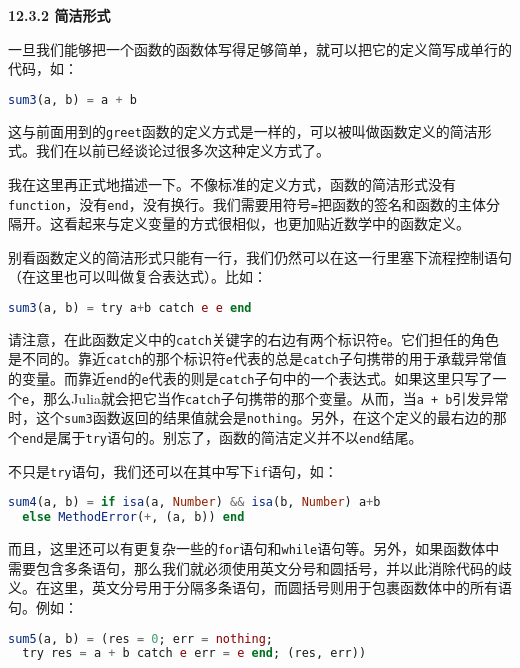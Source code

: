 \textbf{12.3.2 简洁形式}

一旦我们能够把一个函数的函数体写得足够简单，就可以把它的定义简写成单行的代码，如：

\begin{lstlisting}[language=julia]
sum3(a, b) = a + b
\end{lstlisting}

这与前面用到的\verb|greet|函数的定义方式是一样的，可以被叫做函数定义的简洁形式。我们在以前已经谈论过很多次这种定义方式了。
 
我在这里再正式地描述一下。不像标准的定义方式，函数的简洁形式没有\verb|function|，没有\verb|end|，没有换行。我们需要用符号\verb|=|把函数的签名和函数的主体分隔开。这看起来与定义变量的方式很相似，也更加贴近数学中的函数定义。

别看函数定义的简洁形式只能有一行，我们仍然可以在这一行里塞下流程控制语句（在这里也可以叫做复合表达式）。比如：

\begin{lstlisting}[language=julia]
sum3(a, b) = try a+b catch e e end
\end{lstlisting}

请注意，在此函数定义中的\verb|catch|关键字的右边有两个标识符\verb|e|。它们担任的角色是不同的。靠近\verb|catch|的那个标识符\verb|e|代表的总是\verb|catch|子句携带的用于承载异常值的变量。而靠近\verb|end|的\verb|e|代表的则是\verb|catch|子句中的一个表达式。如果这里只写了一个\verb|e|，那么Julia就会把它当作\verb|catch|子句携带的那个变量。从而，当\verb|a + b|引发异常时，这个\verb|sum3|函数返回的结果值就会是\verb|nothing|。另外，在这个定义的最右边的那个\verb|end|是属于\verb|try|语句的。别忘了，函数的简洁定义并不以\verb|end|结尾。

不只是\verb|try|语句，我们还可以在其中写下\verb|if|语句，如：

\begin{lstlisting}[language=julia]
sum4(a, b) = if isa(a, Number) && isa(b, Number) a+b
  else MethodError(+, (a, b)) end 
\end{lstlisting}

而且，这里还可以有更复杂一些的\verb|for|语句和\verb|while|语句等。另外，如果函数体中需要包含多条语句，那么我们就必须使用英文分号和圆括号，并以此消除代码的歧义。在这里，英文分号用于分隔多条语句，而圆括号则用于包裹函数体中的所有语句。例如：

\begin{lstlisting}[language=julia]
sum5(a, b) = (res = 0; err = nothing;
  try res = a + b catch e err = e end; (res, err))
\end{lstlisting}

